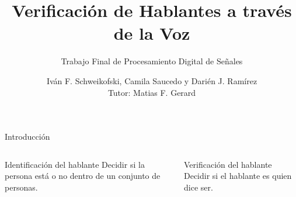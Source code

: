 \documentclass{beamer}
\begin{document}
\title{Verificación de Hablantes a través de la Voz}
\subtitle{Trabajo Final de Procesamiento Digital de Señales}
\author{Iván F. Schweikofski,
        Camila Saucedo y 
        Darién J. Ramírez \\ Tutor: Matias F. Gerard}
\date{\empty}

\frame{\titlepage}

\begin{frame}{Introducción} %

\centering{}

\begin{columns}[t]
\begin{column}{0.5\linewidth}
\begin{block}{Identificación del hablante}
Decidir si la persona está o no dentro de un conjunto de personas.
\end{block}
\end{column}

\begin{column}{0.5\linewidth}
\begin{block}{Verificación del hablante}
Decidir si el hablante es quien dice ser.
\end{block}
\end{column}
\end{columns}

\end{frame}
\end{document}
